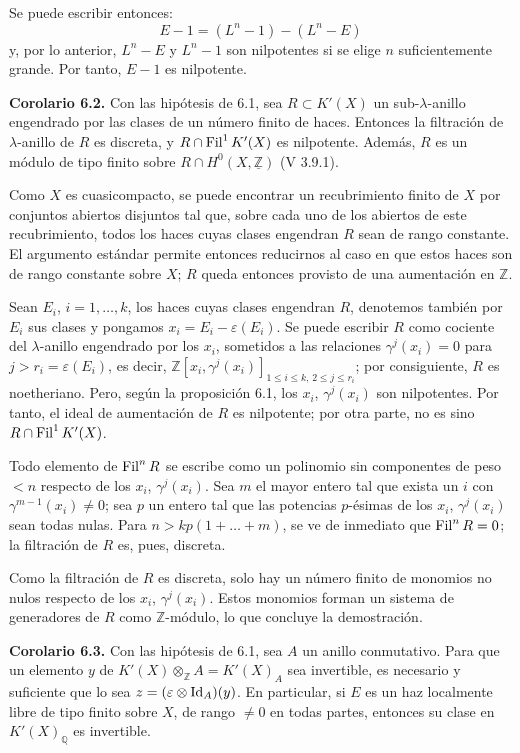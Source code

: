Se puede escribir entonces:
\[
  E-1=(L^n-1)-(L^n-E)
\]
y, por lo anterior, $L^n-E$ y $L^n-1$ son nilpotentes si se elige $n$ suficientemente grande. Por tanto, $E-1$ es nilpotente.


\textbf{Corolario 6.2.} Con las hipótesis de 6.1, sea $R\subset K'(X)$ un sub-$\lambda$-anillo engendrado por las clases de un número finito de haces. Entonces la filtración de $\lambda$-anillo de $R$ es discreta, y $R\cap\operatorname{Fil}^1K'(X)$ es nilpotente. Además, $R$ es un módulo de tipo finito sobre $R\cap H^0(X,\underline{\mathbb Z})$ (V 3.9.1).

Como $X$ es cuasicompacto, se puede encontrar un recubrimiento finito de $X$ por conjuntos abiertos disjuntos tal que, sobre cada uno de los abiertos de este recubrimiento, todos los haces cuyas clases engendran $R$ sean de rango constante. El argumento estándar permite entonces reducirnos al caso en que estos haces son de rango constante sobre $X$; $R$ queda entonces provisto de una aumentación en $\mathbb Z$.

Sean $E_i$, $i=1,\ldots,k$, los haces cuyas clases engendran $R$, denotemos también por $E_i$ sus clases y pongamos $x_i=E_i-\varepsilon(E_i)$. Se puede escribir $R$ como cociente del $\lambda$-anillo engendrado por los $x_i$, sometidos a las relaciones $\gamma^j(x_i)=0$ para $j>r_i=\varepsilon(E_i)$, es decir, $\mathbb Z[x_i,\gamma^j(x_i)]_{1\le i\le k,\,2\le j\le r_i}$; por consiguiente, $R$ es noetheriano. Pero, según la proposición 6.1, los $x_i$, $\gamma^j(x_i)$ son nilpotentes. Por tanto, el ideal de aumentación de $R$ es nilpotente; por otra parte, no es sino $R\cap\operatorname{Fil}^1K'(X)$.

Todo elemento de $\operatorname{Fil}^n R$ se escribe como un polinomio sin componentes de peso $<n$ respecto de los $x_i$, $\gamma^j(x_i)$. Sea $m$ el mayor entero tal que exista un $i$ con $\gamma^{m-1}(x_i)\ne0$; sea $p$ un entero tal que las potencias $p$-ésimas de los $x_i$, $\gamma^j(x_i)$ sean todas nulas. Para $n>kp(1+\ldots+m)$, se ve de inmediato que $\operatorname{Fil}^nR=0$; la filtración de $R$ es, pues, discreta.

Como la filtración de $R$ es discreta, solo hay un número finito de monomios no nulos respecto de los $x_i$, $\gamma^j(x_i)$. Estos monomios forman un sistema de generadores de $R$ como $\mathbb Z$-módulo, lo que concluye la demostración.

\textbf{Corolario 6.3.} Con las hipótesis de 6.1, sea $A$ un anillo conmutativo. Para que un elemento $y$ de $K'(X)\otimes_{\mathbb Z}A=K'(X)_A$ sea invertible, es necesario y suficiente que lo sea $z=(\varepsilon\otimes\operatorname{Id}_A)(y)$. En particular, si $E$ es un haz localmente libre de tipo finito sobre $X$, de rango $\ne0$ en todas partes, entonces su clase en $K'(X)_{\mathbb Q}$ es invertible.

